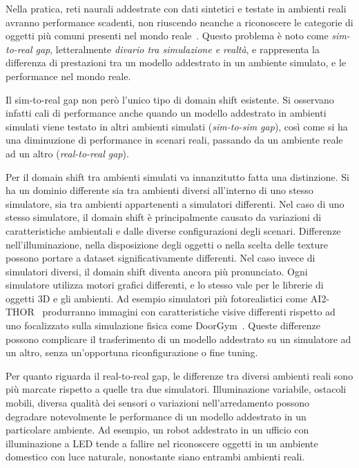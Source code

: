 \documentclass[12pt]{report}
\begin{document}
Nella pratica, reti naurali addestrate con dati sintetici e testate in ambienti reali avranno performance scadenti, non riuscendo neanche a riconoscere le categorie di oggetti più comuni presenti nel mondo reale~\cite{8793591}. Questo problema è noto come \textit{sim-to-real gap}, letteralmente \textit{divario tra simulazione e realtà}, e rappresenta la differenza di prestazioni tra un modello addestrato in un ambiente simulato, e le performance nel mondo reale.

Il sim-to-real gap non però l'unico tipo di domain shift esistente. Si osservano infatti cali di performance anche quando un modello addestrato in ambienti simulati viene testato in altri ambienti simulati (\textit{sim-to-sim gap}), così come si ha una diminuzione di performance in scenari reali, passando da un ambiente reale ad un altro (\textit{real-to-real gap}).

Per il domain shift tra ambienti simulati va innanzitutto fatta una distinzione. Si ha un dominio differente sia tra ambienti diversi all'interno di uno stesso simulatore, sia tra ambienti appartenenti a simulatori differenti. Nel caso di uno stesso simulatore, il domain shift è principalmente causato da variazioni di caratteristiche ambientali e dalle diverse configurazioni degli scenari. Differenze nell'illuminazione, nella disposizione degli oggetti o nella scelta delle texture possono portare a dataset significativamente differenti. Nel caso invece di simulatori diversi, il domain shift diventa ancora più pronunciato. Ogni simulatore utilizza motori grafici differenti, e lo stesso vale per le librerie di oggetti 3D e gli ambienti. Ad esempio simulatori più fotorealistici come AI2-THOR~\cite{kolve2022ai2thorinteractive3denvironment} produrranno immagini con caratteristiche visive differenti rispetto ad uno focalizzato sulla simulazione fisica come DoorGym~\cite{urakami2022doorgymscalabledooropening}. Queste differenze possono complicare il trasferimento di un modello addestrato su un simulatore ad un altro, senza un'opportuna riconfigurazione o fine tuning.

Per quanto riguarda il real-to-real gap, le differenze tra diversi ambienti reali sono più marcate rispetto a quelle tra due simulatori. Illuminazione variabile, ostacoli mobili, diversa qualità dei sensori o variazioni nell'arredamento possono degradare notevolmente le performance di un modello addestrato in un particolare ambiente. Ad esempio, un robot addestrato in un ufficio con illuminazione a LED tende a fallire nel riconoscere oggetti in un ambiente domestico con luce naturale, nonostante siano entrambi ambienti reali.
\end{document}
